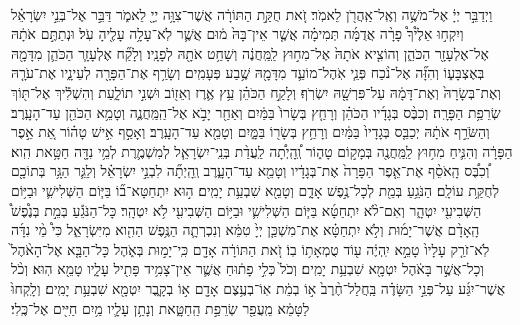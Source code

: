 \documentclass[twoside, openany, parskip=half, 11pt]{book}
\begin{document}
\begin{footnotesize}
\begin{multicols}{2}
\\
 וַיְדַבֵּ֣ר יְיָ֔ אֶל־מֹשֶׁ֥ה וְאֶֽל־אַֽהֲרֹ֖ן לֵאמֹֽר׃ זֹ֚את חֻקַּ֣ת הַתּוֹרָ֔ה אֲשֶׁר־צִוָּ֥ה יְיָ֖ לֵאמֹ֑ר דַּבֵּ֣ר אֶל־בְּנֵ֣י יִשְׂרָאֵ֗ל וְיִקְח֣וּ אֵלֶ֩יךָ֩ פָרָ֨ה אֲדֻמָּ֜ה תְּמִימָ֗ה אֲשֶׁ֤ר אֵין־בָּהּ֙ מ֔וּם אֲשֶׁ֛ר לֹֽא־עָלָ֥ה עָלֶ֖יהָ עֹֽל׃ וּנְתַתֶּ֣ם אֹתָ֔הּ אֶל־אֶלְעָזָ֖ר הַכֹּהֵ֑ן וְהוֹצִ֤יא אֹתָהּ֙ אֶל־מִח֣וּץ לַֽמַּֽחֲנֶ֔ה וְשָׁחַ֥ט אֹתָ֖הּ לְפָנָֽיו׃ וְלָקַ֞ח אֶלְעָזָ֧ר הַכֹּהֵ֛ן מִדָּמָ֖הּ בְּאֶצְבָּע֑וֹ וְהִזָּ֞ה אֶל־נֹ֨כַח פְּנֵ֧י אֹֽהֶל־מוֹעֵ֛ד מִדָּמָ֖הּ שֶׁ֥בַע פְּעָמִֽים׃ וְשָׂרַ֥ף אֶת־הַפָּרָ֖ה לְעֵינָ֑יו אֶת־עֹרָ֤הּ וְאֶת־בְּשָׂרָהּ֙ וְאֶת־דָּמָ֔הּ עַל־פִּרְשָׁ֖הּ יִשְׂרֹֽף׃ וְלָקַ֣ח הַכֹּהֵ֗ן עֵ֥ץ אֶ֛רֶז וְאֵז֖וֹב וּשְׁנִ֣י תוֹלָ֑עַת וְהִשְׁלִ֕יךְ אֶל־תּ֖וֹךְ שְׂרֵפַ֥ת הַפָּרָֽה׃  וְכִבֶּ֨ס בְּגָדָ֜יו הַכֹּהֵ֗ן וְרָחַ֤ץ בְּשָׂרוֹ֙ בַּמַּ֔יִם וְאַחַ֖ר יָבֹ֣א אֶל־הַֽמַּֽחֲנֶ֑ה וְטָמֵ֥א הַכֹּהֵ֖ן עַד־הָעָֽרֶב׃ וְהַשֹּׂרֵ֣ף אֹתָ֔הּ יְכַבֵּ֤ס בְּגָדָיו֙ בַּמַּ֔יִם וְרָחַ֥ץ בְּשָׂר֖וֹ בַּמָּ֑יִם וְטָמֵ֖א עַד־הָעָֽרֶב׃ וְאָסַ֣ף אִ֣ישׁ טָה֗וֹר אֵ֚ת אֵ֣פֶר הַפָּרָ֔ה וְהִנִּ֛יחַ מִח֥וּץ לַֽמַּֽחֲנֶ֖ה בְּמָק֣וֹם טָה֑וֹר וְֽ֠הָֽיְתָ֠ה לַֽעֲדַ֨ת בְּנֵֽי־יִשְׂרָאֵ֧ל לְמִשְׁמֶ֛רֶת לְמֵ֥י נִדָּ֖ה חַטָּ֥את הִֽוא׃ 
 וְ֠כִבֶּ֠ס הָֽאֹסֵ֨ף אֶת־אֵ֤פֶר הַפָּרָה֙ אֶת־בְּגָדָ֔יו וְטָמֵ֖א עַד־הָעָ֑רֶב וְֽהָֽיְתָ֞ה לִבְנֵ֣י יִשְׂרָאֵ֗ל וְלַגֵּ֛ר הַגָּ֥ר בְּתוֹכָ֖ם לְחֻקַּ֥ת עוֹלָֽם׃ 
 הַנֹּגֵ֥עַ בְּמֵ֖ת לְכָל־נֶ֣פֶשׁ אָדָ֑ם וְטָמֵ֖א שִׁבְעַ֥ת יָמִֽים׃ ה֣וּא יִתְחַטָּא־ב֞וֹ בַּיּ֧וֹם הַשְּׁלִישִׁ֛י וּבַיּ֥וֹם הַשְּׁבִיעִ֖י יִטְהָ֑ר וְאִם־לֹ֨א יִתְחַטָּ֜א בַּיּ֧וֹם הַשְּׁלִישִׁ֛י וּבַיּ֥וֹם הַשְּׁבִיעִ֖י לֹ֥א יִטְהָֽר׃ כָּל־הַנֹּגֵ֡עַ בְּמֵ֣ת בְּנֶ֩פֶשׁ֩ הָֽאָדָ֨ם אֲשֶׁר־יָמ֜וּת וְלֹ֣א יִתְחַטָּ֗א אֶת־מִשְׁכַּ֤ן יְיָ֙ טִמֵּ֔א וְנִכְרְתָ֛ה הַנֶּ֥פֶשׁ הַהִ֖וא מִיִּשְׂרָאֵ֑ל כִּי֩ מֵ֨י נִדָּ֜ה לֹֽא־זֹרַ֤ק עָלָיו֙ טָמֵ֣א יִֽהְיֶ֔ה ע֖וֹד טֻמְאָת֥וֹ בֽוֹ׃ זֹ֚את הַתּוֹרָ֔ה אָדָ֖ם כִּֽי־יָמ֣וּת בְּאֹ֑הֶל כָּל־הַבָּ֤א אֶל־הָאֹ֨הֶל֙ וְכָל־אֲשֶׁ֣ר בָּאֹ֔הֶל יִטְמָ֖א שִׁבְעַ֥ת יָמִֽים׃ וְכֹל֙ כְּלִ֣י פָת֔וּחַ אֲשֶׁ֛ר אֵין־צָמִ֥יד פָּתִ֖יל עָלָ֑יו טָמֵ֖א הֽוּא׃ וְכֹ֨ל אֲשֶׁר־יִגַּ֜ע עַל־פְּנֵ֣י הַשָּׂדֶ֗ה בַּֽחֲלַל־חֶ֨רֶב֙ א֣וֹ בְמֵ֔ת אֽוֹ־בְעֶ֥צֶם אָדָ֖ם א֣וֹ בְקָ֑בֶר יִטְמָ֖א שִׁבְעַ֥ת יָמִֽים׃ וְלָֽקְחוּ֙ לַטָּמֵ֔א מֵֽעֲפַ֖ר שְׂרֵפַ֣ת הַֽחַטָּ֑את וְנָתַ֥ן עָלָ֛יו מַ֥יִם חַיִּ֖ים אֶל־כֶּֽלִי׃


\end{multicols}
\end{footnotesize}
\end{document}
